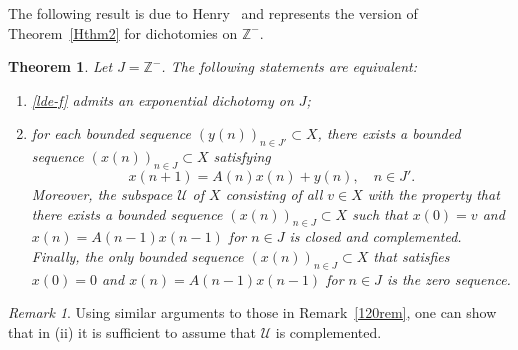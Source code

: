 \documentclass[11pt,reqno,a4paper]{amsart}
\theoremstyle{plain}
\numberwithin{equation}{section}
\newtheorem{theorem}{Theorem}
\theoremstyle{remark}
\newtheorem{remark}{Remark}
\def\Z{\mathbb{Z}}
\begin{document}

The following result is due to Henry~\cite[Corollary 1.11]{H1} and represents the version of Theorem~\ref{Hthm2} for dichotomies on $\Z^-$.
\begin{theorem}\label{Hthm3}
Let $J=\Z^-$. The following statements are equivalent:
\begin{enumerate}
\item[(i)] \eqref{lde-f} admits an exponential dichotomy on $J$;
\item[(ii)] for each bounded sequence $(y(n))_{n\in J'}\subset X$, there exists a bounded sequence $(x(n))_{n\in J}\subset X$ satisfying 
\begin{equation}\label{ADM3-3}
x(n+1)=A(n)x(n)+y(n), \quad n\in J'.
\end{equation}
Moreover, the subspace $\mathcal U$ of $X$ consisting of all $v\in X$ with the property that there exists a bounded sequence $(x(n))_{n\in J}\subset X$ such that $x(0)=v$ and $x(n)=A(n-1)x(n-1)$ for $n\in J$ is closed and complemented. Finally, the only bounded sequence $(x(n))_{n\in J}\subset X$ that satisfies $x(0)=0$ and $x(n)=A(n-1)x(n-1)$ for $n\in J$ is the zero sequence.
\end{enumerate}
\end{theorem}

\begin{remark}\label{1037rem}
Using similar arguments to those in Remark~\ref{120rem}, one can show that in (ii) it is sufficient to assume that $\mathcal U$ is complemented. 
\end{remark}
\end{document}
